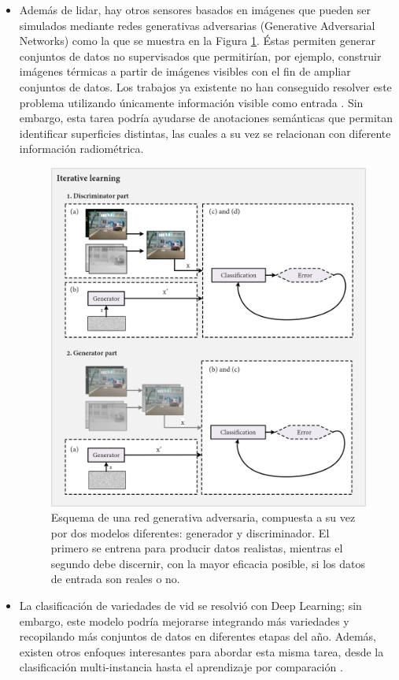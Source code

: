\begin{itemize}
    \item Además de \acrshort{lidar}, hay otros sensores basados en imágenes que pueden ser simulados mediante redes generativas adversarias (Generative Adversarial Networks) como la que se muestra en la Figura \ref{fig:conclusiones_gan}. Éstas permiten generar conjuntos de datos no supervisados que permitirían, por ejemplo, construir imágenes térmicas a partir de imágenes visibles con el fin de ampliar conjuntos de datos. Los trabajos ya existente no han conseguido resolver este problema utilizando únicamente información visible como entrada \cite{li_multi-branch_2019, li_i-gans_2021, kniaz_thermalgan_2019, ozkanoglu_infragan_2022, yi_cycle_2023}. Sin embargo, esta tarea podría ayudarse de anotaciones semánticas que permitan identificar superficies distintas, las cuales a su vez se relacionan con diferente información radiométrica.
    \begin{figure}[ht]
        \centering
        \includegraphics[width=\linewidth]{figs/conclusions/gan.png}
        \caption{Esquema de una red generativa adversaria, compuesta a su vez por dos modelos diferentes: generador y discriminador. El primero se entrena para producir datos realistas, mientras el segundo debe discernir, con la mayor eficacia posible, si los datos de entrada son reales o no.}
        \label{fig:conclusiones_gan}
    \end{figure}
    \item La clasificación de variedades de vid se resolvió con Deep Learning; sin embargo, este modelo podría mejorarse integrando más variedades y recopilando más conjuntos de datos en diferentes etapas del año. Además, existen otros enfoques interesantes para abordar esta misma tarea, desde la clasificación multi-instancia \cite{meerdink_multitarget_2022} hasta el aprendizaje por comparación \cite{guan_spatial-spectral_2022}. 
\end{itemize}
